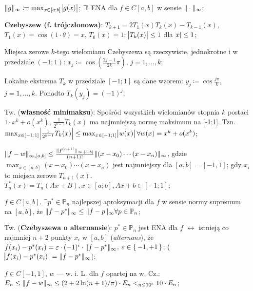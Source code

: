 
\entry
$\|g\|_\infty \coloneqq \max_{x \in [a;b]} \abs{g(x)}$;
\entry
$\exists !$
ENA dla
$f\in C[a,b]$
w sensie
$\|\cdot\|_\infty$;


\entry
\textbf{Czebyszew (f. trójczłonowa)}:
$T_{k + 1} = 2T_1(x)T_k(x) - T_{k-1}(x)$,
$T_1(x) = \cos(1 \cdot \theta)=x$,
$T_0(x) = 1$;
\entry
$\abs{T_k(x)} \leq 1$
dla
$\abs{x} \leq 1$;

\entry
Miejsca zerowe $k$-tego wielomianu Czebyszewa są rzeczywiste, jednokrotne i w przedziale $(-1;1)$:
$x_j \coloneqq \cos(\frac{2j-1}{2k}\pi)$,
$j=1,\ldots,k$;

\entry
Lokalne ekstrema $T_k$ w przedziale $[-1;1]$ są dane wzorem:
$y_j \coloneqq \cos \frac{j\pi}{k}$,
$j=1,\ldots,k$.
Ponadto
$T_k(y_j) = (-1)^j$;

\entry
Tw. (\textbf{własność minimaksu}):
Spośród wszystkich wielomianów stopnia $k$ postaci
$1 \cdot x^k + o(x^k)$,
$\frac{1}{2^{k-1}} T_k(x)$
ma najmniejszą normę maksimum na [-1;1].
Tzn.
$\max_{x \in [-1;1]} \abs{\frac{1}{2^{k-1}} T_k(x)} \leq
\max_{x \in [-1;1]} \abs{w(x)}
\forall w(x) = x^k + o(x^k)$;

\entry
$\|f-w\|_{\infty, [a,b]} \leq
\frac{\|f^{(n+1)}\|_{\infty, [a,b]}}{(n+1)!}
\|(x-x_0) \cdots (x - x_n)\|_\infty$,
gdzie
$\max_{x\in[a,b]} (x-x_0)\cdots(x-x_n)$
jest najmniejszy dla
$[a,b] = [-1,1]$;
gdy $x_i$ to miejsca zerowe $T_{n + 1}(x)$.
\entry
$T^{*}_n(x) = T_n(Ax+B), x \in [a;b], Ax+b \in [-1;1]$;

\entry
$f \in C[a,b]$.
$\exists p^{*} \in \mathbb{P}_n$
najlepszej aproksymacji dla $f$ w sensie normy supremum na $[a,b]$, że
$\|f - p^{*}\|_\infty \leq \|f - p\|_\infty \forall p\in \mathbb{P}_n$;

\entry
Tw. (\textbf{Czebyszewa o alternansie}):
$p^{*} \in \mathbb{P}_n$
jest ENA dla $f$
$\leftrightarrow$
istnieją co najmniej $n+2$ punkty $x_i$ w $[a,b]$ (\textit{alternans}), że
$f(x_i) - p^{*}(x_i) = \varepsilon \cdot (-1)^i \cdot \|f - p^{*}\|_\infty$,
$\varepsilon \in \set{-1,+1}$;
($\abs{f(x_i) - p^{*}(x_i)} = \|f - p^{*}\|_\infty$);


\entry
$f \in C[-1,1]$,
$w$ --- w. i. L. dla $f$ opartej na w. Cz.:
$E_n \leq
\|f - w\|_\infty \leq
(2 + 2 \ln(n + 1) / \pi)\cdot E_n <_{n \leq 10^5}
10\cdot E_n$;
